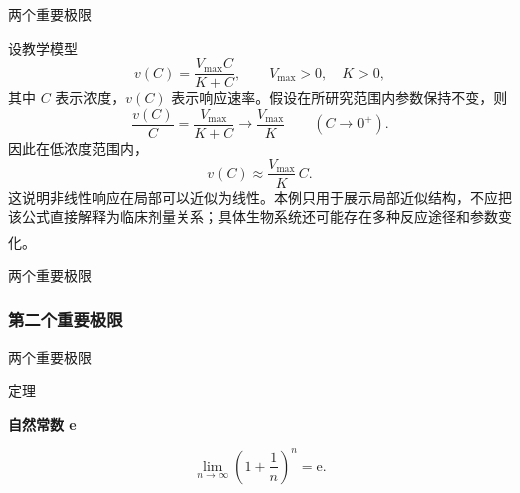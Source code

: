 \documentclass[aspectratio=169,10pt,fontset=fandol]{ctexbeamer}
\newenvironment{custom}[1]{\par\noindent\textbf{#1}\quad}{\par\vspace{0.8em}}
\newcommand{\ee}{\mathrm{e}}
\newcommand{\upcite}[1]{\textsuperscript{\textsuperscript{\cite{#1}}}}
\begin{document}
\begin{frame}[t,fragile]{两个重要极限}
\footnotesize
{\footnotesize
\begin{application}
设教学模型
\[
v(C)=\frac{V_{\max}C}{K+C},\qquad V_{\max}>0,\quad K>0,
\]
其中 $C$ 表示浓度，$v(C)$ 表示响应速率。假设在所研究范围内参数保持不变，则
\[
\frac{v(C)}{C}=\frac{V_{\max}}{K+C}
\longrightarrow\frac{V_{\max}}K
\qquad(C\to0^+).
\]
因此在低浓度范围内，
\[
v(C)\approx\frac{V_{\max}}K\,C.
\]
这说明非线性响应在局部可以近似为线性。本例只用于展示局部近似结构，不应把该公式直接解释为临床剂量关系；具体生物系统还可能存在多种反应途径和参数变化。\upcite{NCBIEnzyme}
\end{application}
}
\end{frame}
\begin{frame}[t,fragile]{两个重要极限}
\footnotesize
{\footnotesize
\subsubsection*{第二个重要极限}


}
\end{frame}
\begin{frame}[t,fragile]{两个重要极限}
\footnotesize
\begin{block}{定理}
{\footnotesize
\textbf{自然常数 e }\par

	\[
	\lim_{n\to\infty} \left(1 + \dfrac{1}{n}\right)^n = \ee.
	\]

}
\end{block}
\end{frame}
\end{document}
